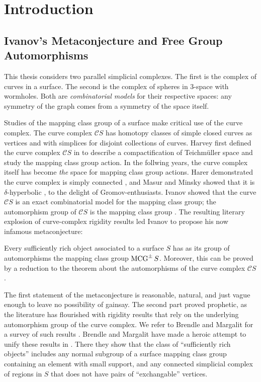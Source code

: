 \chapter{Introduction}




\section{Ivanov's Metaconjecture and Free Group Automorphisms}

This thesis considers two parallel simplicial complexes.
The first is the complex of curves in a surface.
The second is the complex of spheres in 3-space with wormholes.
Both are \emph{combinatorial models} for their respective spaces:
any symmetry of the graph comes from a symmetry of the space itself.


Studies of the mapping class group of a surface make critical use of the curve complex.
The curve complex $\mathcal C S$ has homotopy classes of simple closed curves as vertices and with simplices for disjoint collections of curves.
Harvey first defined the  curve complex $\mathcal C S$ in \cite{MR624817}
 to describe a compactification of Teichm\"uller space and study the mapping class group action.
In the follwing years, the curve complex itself has become \emph{the} space for mapping class group actions.
Harer demonstrated the curve complex is simply connected \cite{MR786348}, and Masur and Minsky showed that it is $\delta$-hyperbolic \cite{MR1714338}, to the delight of Gromov-enthusiasts.
Ivanov showed that the curve $\mathcal C S$ is an exact combinatorial model for
the mapping class group;  the automorphism group of $\mathcal C S$ is the mapping class group \cite{MR1460387}.
The resulting literary explosion of curve-complex rigidity results led Ivanov
to propose his now infamous metaconjecture:

\begin{metaconjecture}
Every sufficiently rich object associated to a surface $S$ has as its group of automorphisms the mapping class group $\operatorname{MCG}^\pm S$.
Moreover, this can
be proved by a reduction to the theorem about the automorphisms of the curve complex $\mathcal C S$.
\end{metaconjecture}



The first statement of the metaconjecture is reasonable, natural, and just vague enough to leave no possibility of gainsay.
The second part proved prophetic, %
 as the literature has
flourished with rigidity results that rely on the underlying automorphism group of the curve complex.
We refer to Brendle and Margalit for a survey of such results \cite{meta}.
Brendle and Margalit have made a heroic attempt to unify these results in \cite{meta}.
There they show that the class of ``sufficiently rich objects'' includes any normal subgroup of a surface mapping class group containing an element with small support, and any connected simplicial complex of regions in $S$ that does not have pairs of ``exchangable'' vertices.


